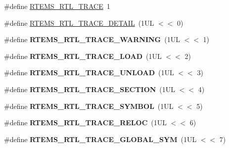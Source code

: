 \begin{DoxyCompactItemize}
\item 
\#define \mbox{\hyperlink{rtl-trace_8h_a6066050a07fb6e0ea62bac07f93dc7b3}{R\+T\+E\+M\+S\+\_\+\+R\+T\+L\+\_\+\+T\+R\+A\+CE}}~1
\item 
\#define \mbox{\hyperlink{rtl-trace_8h_a4e33a069df0d1df9815b6a73911bd953}{R\+T\+E\+M\+S\+\_\+\+R\+T\+L\+\_\+\+T\+R\+A\+C\+E\+\_\+\+D\+E\+T\+A\+IL}}~(1\+U\+L $<$$<$ 0)
\item 
\mbox{\label{rtl-trace_8h_a822bbc53a445572862f1b2d1df95cae3}} 
\#define {\bfseries R\+T\+E\+M\+S\+\_\+\+R\+T\+L\+\_\+\+T\+R\+A\+C\+E\+\_\+\+W\+A\+R\+N\+I\+NG}~(1\+U\+L $<$$<$ 1)
\item 
\mbox{\label{rtl-trace_8h_a94e20e1a3c06253fe63e976d2f16e661}} 
\#define {\bfseries R\+T\+E\+M\+S\+\_\+\+R\+T\+L\+\_\+\+T\+R\+A\+C\+E\+\_\+\+L\+O\+AD}~(1\+U\+L $<$$<$ 2)
\item 
\mbox{\label{rtl-trace_8h_a87c0fa729026459987925e3001ad31c6}} 
\#define {\bfseries R\+T\+E\+M\+S\+\_\+\+R\+T\+L\+\_\+\+T\+R\+A\+C\+E\+\_\+\+U\+N\+L\+O\+AD}~(1\+U\+L $<$$<$ 3)
\item 
\mbox{\label{rtl-trace_8h_a6386265f2c270ebba4f451ba97322869}} 
\#define {\bfseries R\+T\+E\+M\+S\+\_\+\+R\+T\+L\+\_\+\+T\+R\+A\+C\+E\+\_\+\+S\+E\+C\+T\+I\+ON}~(1\+U\+L $<$$<$ 4)
\item 
\mbox{\label{rtl-trace_8h_a509bbfdb9b7dfca5a6d12f95278ef046}} 
\#define {\bfseries R\+T\+E\+M\+S\+\_\+\+R\+T\+L\+\_\+\+T\+R\+A\+C\+E\+\_\+\+S\+Y\+M\+B\+OL}~(1\+U\+L $<$$<$ 5)
\item 
\mbox{\label{rtl-trace_8h_a6041a55368726f5b55284c5b8dfeabd5}} 
\#define {\bfseries R\+T\+E\+M\+S\+\_\+\+R\+T\+L\+\_\+\+T\+R\+A\+C\+E\+\_\+\+R\+E\+L\+OC}~(1\+U\+L $<$$<$ 6)
\item 
\mbox{\label{rtl-trace_8h_ad4680399fdc53d13cfba72b0233f5865}} 
\#define {\bfseries R\+T\+E\+M\+S\+\_\+\+R\+T\+L\+\_\+\+T\+R\+A\+C\+E\+\_\+\+G\+L\+O\+B\+A\+L\+\_\+\+S\+YM}~(1\+U\+L $<$$<$ 7)
\item 
\mbox{\label{rtl-trace_8h_a022e7574ece48d57c9cfabb605a119f0}} 

\end{DoxyCompactItemize}
